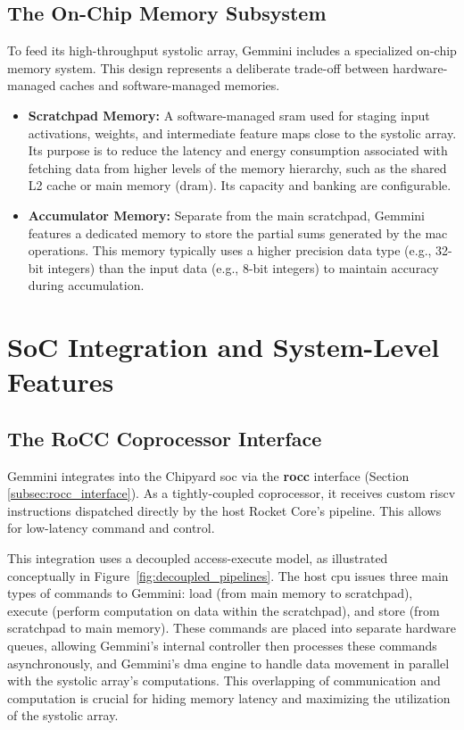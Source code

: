 \subsection{The On-Chip Memory Subsystem}
To feed its high-throughput systolic array, Gemmini includes a specialized on-chip memory system. This design represents a deliberate trade-off between hardware-managed caches and software-managed memories.
\begin{itemize}
    \item \textbf{Scratchpad Memory:} A software-managed \acrshort{sram} used for staging input activations, weights, and intermediate feature maps close to the systolic array. Its purpose is to reduce the latency and energy consumption associated with fetching data from higher levels of the memory hierarchy, such as the shared L2 cache or main memory (\acrshort{dram}). Its capacity and banking are configurable.
    \item \textbf{Accumulator Memory:} Separate from the main scratchpad, Gemmini features a dedicated memory to store the partial sums generated by the \acrshort{mac} operations. This memory typically uses a higher precision data type (e.g., 32-bit integers) than the input data (e.g., 8-bit integers) to maintain accuracy during accumulation.
\end{itemize}

\section{SoC Integration and System-Level Features}
\label{sec:gemmini_soc_integration}

\subsection{The RoCC Coprocessor Interface}
Gemmini integrates into the Chipyard \acrshort{soc} via the \textbf{\acrfull{rocc}} interface (Section \ref{subsec:rocc_interface}). As a tightly-coupled coprocessor, it receives custom \acrshort{riscv} instructions dispatched directly by the host Rocket Core's pipeline. This allows for low-latency command and control.

This integration uses a decoupled access-execute model, as illustrated conceptually in Figure~\ref{fig:decoupled_pipelines}. The host \acrshort{cpu} issues three main types of commands to Gemmini: load (from main memory to scratchpad), execute (perform computation on data within the scratchpad), and store (from scratchpad to main memory). These commands are placed into separate hardware queues, allowing Gemmini's internal controller then processes these commands asynchronously, and Gemmini's \acrshort{dma} engine to handle data movement in parallel with the systolic array's computations. This overlapping of communication and computation is crucial for hiding memory latency and maximizing the utilization of the systolic array.

